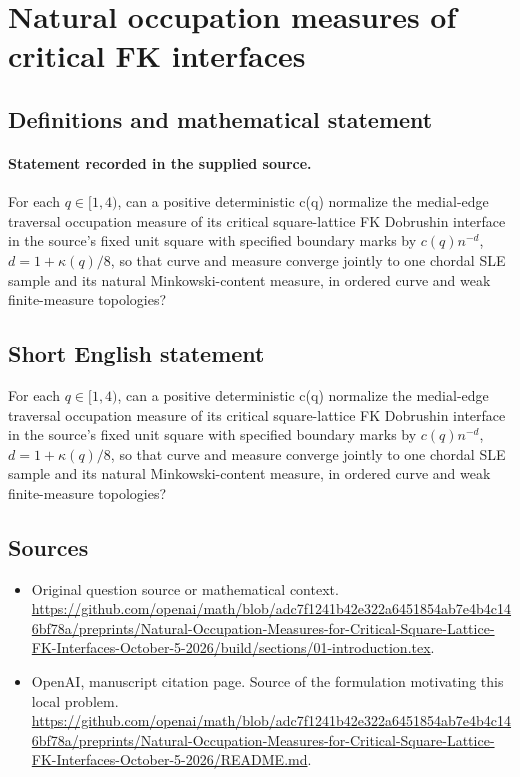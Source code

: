 \documentclass[11pt]{article}
\begin{document}
\section*{Natural occupation measures of critical FK interfaces}\label{statement}
\subsection{Definitions and mathematical statement}
\paragraph{Statement recorded in the supplied source.}
For each $q\in [1,4)$, can a positive deterministic c(q) normalize the medial-edge traversal occupation measure of its critical square-lattice FK Dobrushin interface in the source's fixed unit square with specified boundary marks by $c(q)n^{-d}$, $d=1+\kappa (q)/8$, so that curve and measure converge jointly to one chordal SLE sample and its natural Minkowski-content measure, in ordered curve and weak finite-measure topologies?
\subsection{Short English statement}
For each $q\in [1,4)$, can a positive deterministic c(q) normalize the medial-edge traversal occupation measure of its critical square-lattice FK Dobrushin interface in the source's fixed unit square with specified boundary marks by $c(q)n^{-d}$, $d=1+\kappa (q)/8$, so that curve and measure converge jointly to one chordal SLE sample and its natural Minkowski-content measure, in ordered curve and weak finite-measure topologies?
\subsection{Sources}
\begin{itemize}
\item[S1] Original question source or mathematical context.
\url{https://github.com/openai/math/blob/adc7f1241b42e322a6451854ab7e4b4c146bf78a/preprints/Natural-Occupation-Measures-for-Critical-Square-Lattice-FK-Interfaces-October-5-2026/build/sections/01-introduction.tex}.
\item[S2] OpenAI, manuscript citation page. Source of the formulation motivating this local problem.
\url{https://github.com/openai/math/blob/adc7f1241b42e322a6451854ab7e4b4c146bf78a/preprints/Natural-Occupation-Measures-for-Critical-Square-Lattice-FK-Interfaces-October-5-2026/README.md}.
\end{itemize}
\end{document}
